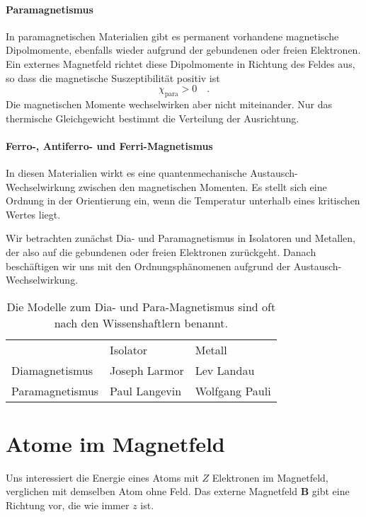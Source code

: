 \paragraph*{Paramagnetismus} In paramagnetischen Materialien gibt es permanent vorhandene magnetische Dipolmomente, ebenfalls wieder aufgrund der gebundenen oder freien Elektronen. Ein externes Magnetfeld richtet diese Dipolmomente in Richtung des Feldes aus, so dass die magnetische Suszeptibilität positiv ist
\begin{equation}
    \chi_\text{para} > 0 \quad .
\end{equation}
Die magnetischen Momente wechselwirken aber nicht miteinander. Nur das thermische Gleichgewicht bestimmt die Verteilung der Ausrichtung.

\paragraph*{Ferro-, Antiferro- und Ferri-Magnetismus} In diesen Materialien wirkt es eine quantenmechanische Austausch-Wechselwirkung zwischen den magnetischen Momenten. Es stellt sich eine Ordnung in der Orientierung  ein, wenn die Temperatur unterhalb eines kritischen Wertes liegt. 

Wir betrachten zunächst Dia- und Paramagnetismus in Isolatoren und Metallen, der also auf die gebundenen oder freien Elektronen zurückgeht.
  Danach beschäftigen wir  uns mit den Ordnungsphänomenen aufgrund der Austausch-Wechselwirkung.


  \begin{table}
    \begin{tabular}{lll}
                    & Isolator & Metall \\
    Diamagnetismus &  Joseph Larmor & Lev Landau \\
    Paramagnetismus & Paul Langevin & Wolfgang Pauli \\
    \end{tabular}
    \caption{Die  Modelle zum Dia- und Para-Magnetismus sind oft nach den Wissenshaftlern benannt. }    
  \end{table}

\section{Atome im Magnetfeld}

Uns interessiert die Energie eines Atoms mit $Z$ Elektronen im Magnetfeld, verglichen mit demselben Atom ohne Feld. Das externe Magnetfeld $\bm{B}$ gibt eine Richtung vor, die wie immer $z$ ist.

